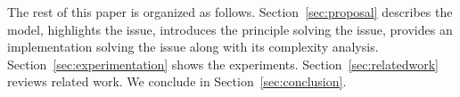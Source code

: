 
The rest of this paper is organized as follows.
Section~\ref{sec:proposal} describes the model, highlights the issue, introduces
the principle solving the issue, provides an implementation solving the issue
along with its complexity analysis. Section~\ref{sec:experimentation} shows the
experiments. Section~\ref{sec:relatedwork} reviews related work. We conclude in
Section~\ref{sec:conclusion}.


